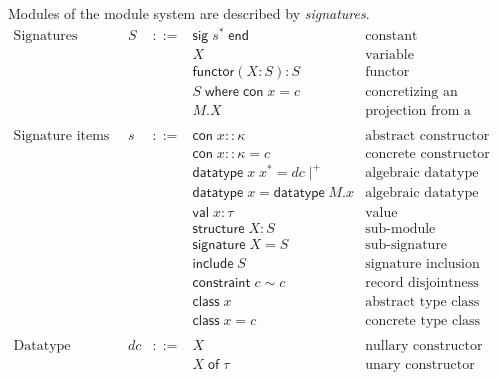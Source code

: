 \documentclass{article}
\newcommand{\mt}[1]{\mathsf{#1}}
\begin{document}
Modules of the module system are described by \emph{signatures}.
$$\begin{array}{rrcll}
  \textrm{Signatures} & S &::=& \mt{sig} \; s^* \; \mt{end} & \textrm{constant} \\
  &&& X & \textrm{variable} \\
  &&& \mt{functor}(X : S) : S & \textrm{functor} \\
  &&& S \; \mt{where} \; \mt{con} \; x = c & \textrm{concretizing an abstract constructor} \\
  &&& M.X & \textrm{projection from a module} \\
  \\
  \textrm{Signature items} & s &::=& \mt{con} \; x :: \kappa & \textrm{abstract constructor} \\
  &&& \mt{con} \; x :: \kappa = c & \textrm{concrete constructor} \\
  &&& \mt{datatype} \; x \; x^* = dc\mid^+ & \textrm{algebraic datatype definition} \\
  &&& \mt{datatype} \; x = \mt{datatype} \; M.x & \textrm{algebraic datatype import} \\
  &&& \mt{val} \; x : \tau & \textrm{value} \\
  &&& \mt{structure} \; X : S & \textrm{sub-module} \\
  &&& \mt{signature} \; X = S & \textrm{sub-signature} \\
  &&& \mt{include} \; S & \textrm{signature inclusion} \\
  &&& \mt{constraint} \; c \sim c & \textrm{record disjointness constraint} \\
  &&& \mt{class} \; x & \textrm{abstract type class} \\
  &&& \mt{class} \; x = c & \textrm{concrete type class} \\
  \\
  \textrm{Datatype constructors} & dc &::=& X & \textrm{nullary constructor} \\
  &&& X \; \mt{of} \; \tau & \textrm{unary constructor} \\
\end{array}$$
\end{document}
